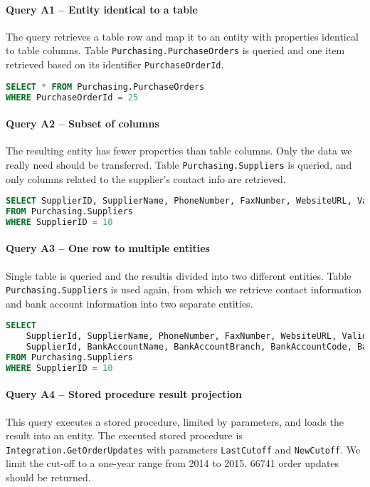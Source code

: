 \paragraph{Query A1 -- Entity identical to a table}
\label{query:a1}
The query retrieves a table row and map it to an entity with properties identical to table columns. 
Table \texttt{Purchasing.PurchaseOrders} is queried and one item retrieved based on its identifier \texttt{PurchaseOrderId}.

\begin{lstlisting}[language=SQL]
SELECT * FROM Purchasing.PurchaseOrders 
WHERE PurchaseOrderId = 25
\end{lstlisting}

\paragraph{Query A2 -- Subset of columns}
\label{query:a2}
The resulting entity has fewer properties than table columns. Only the data we really need should be transferred. 
Table \texttt{Purchasing.Suppliers} is queried, and only columns related to the supplier's contact info are retrieved.

\begin{lstlisting}[language=SQL]
SELECT SupplierID, SupplierName, PhoneNumber, FaxNumber, WebsiteURL, ValidFrom, ValidTo 
FROM Purchasing.Suppliers 
WHERE SupplierID = 10
\end{lstlisting}

\paragraph{Query A3 -- One row to multiple entities}
\label{query:a3}
Single table is queried and the resultis divided into two different entities. 
Table \texttt{Purchasing.Suppliers} is used again, from which we retrieve contact information and bank account information into two separate entities. 

\begin{lstlisting}[language=SQL]
SELECT 
    SupplierId, SupplierName, PhoneNumber, FaxNumber, WebsiteURL, ValidFrom, ValidTo, 
    SupplierId, BankAccountName, BankAccountBranch, BankAccountCode, BankAccountNumber, BankInternationalCode 
FROM Purchasing.Suppliers 
WHERE SupplierID = 10
\end{lstlisting}

\paragraph{Query A4 -- Stored procedure result projection}
\label{query:a4}
This query executes a stored procedure, limited by parameters, and loads the result into an entity.
The executed stored procedure is \texttt{Integration.GetOrderUpdates} with parameters \texttt{LastCutoff} and \texttt{NewCutoff}. 
We limit the cut-off to a one-year range from 2014 to 2015. 66741 order updates should be returned.


